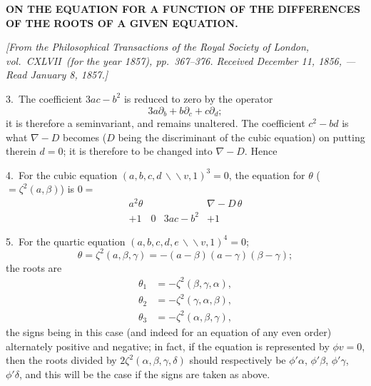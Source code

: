 \documentclass[11pt,a4paper]{article}
\theoremstyle{plain}
\theoremstyle{definition}
\theoremstyle{remark}
\begin{document}
\setcounter{page}{301}


\begin{center}
\textbf{ON THE EQUATION FOR A FUNCTION OF THE DIFFERENCES OF THE ROOTS OF A GIVEN EQUATION.}\par
\smallskip
\textit{[From the \textit{Philosophical Transactions} of the Royal Society of London, vol.~CXLVII\ (for the year 1857), pp.~367--376. Received December 11, 1856, --- Read January 8, 1857.]}
\end{center}

\smallskip

3.\ The coefficient $3ac-b^2$ is reduced to zero by the operator
\[
3a\partial_b + b\partial_c + c\partial_d;
\]
it is therefore a seminvariant, and remains unaltered. The coefficient $c^2-bd$ is what $\nabla-D$ becomes ($D$ being the discriminant of the cubic equation) on putting therein $d=0$; it is therefore to be changed into $\nabla-D$. Hence

4.\ For the cubic equation $(a,b,c,d\,\backslash\!\!\backslash v,1)^3=0$, the equation for $\theta$ ($=\zeta^2(a,\beta)$) is $0=$
\[
\begin{array}{cccc}
a^2\theta & & & \nabla-D\,\theta\\
+1 & 0 & 3ac-b^2 & +1
\end{array}
\]

5.\ For the quartic equation $(a,b,c,d,e\,\backslash\!\!\backslash v,1)^4=0$;
\[
\theta = \zeta^2(a,\beta,\gamma) = -(a-\beta)(a-\gamma)(\beta-\gamma);
\]
the roots are
\begin{align*}
\theta_1 &= -\zeta^2(\beta,\gamma,\alpha),\\
\theta_2 &= -\zeta^2(\gamma,\alpha,\beta),\\
\theta_3 &= -\zeta^2(\alpha,\beta,\gamma),
\end{align*}
the signs being in this case (and indeed for an equation of any even order) alternately positive and negative; in fact, if the equation is represented by $\phi v=0$, then the roots divided by $2\zeta^2(\alpha,\beta,\gamma,\delta)$ should respectively be $\phi'\alpha$, $\phi'\beta$, $\phi'\gamma$, $\phi'\delta$, and this will be the case if the signs are taken as above.
\end{document}
